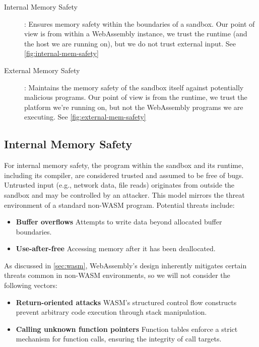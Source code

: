 \begin{description}
    \item[Internal Memory Safety]: Ensures memory safety within the boundaries of a sandbox.
    Our point of view is from within a WebAssembly instance, we trust the runtime (and the host we are running on), but we do not trust external input.
    See \cref{fig:internal-mem-safety}
    \item[External Memory Safety]: Maintains the memory safety of the sandbox itself against potentially malicious programs.
    Our point of view is from the runtime, we trust the platform we're running on, but not the WebAssembly programs we are executing.
    See \cref{fig:external-mem-safety}
\end{description}

\subsection{Internal Memory Safety}
\label{subsec:internal-memory-safety}
For internal memory safety, the program within the sandbox and its runtime, including its compiler, are considered trusted and assumed to be free of bugs.
Untrusted input (e.g., network data, file reads) originates from outside the sandbox and may be controlled by an attacker.
This model mirrors the threat environment of a standard non-\ac{WASM} program.
Potential threats include:

\begin{itemize}
    \item \textbf{Buffer overflows} Attempts to write data beyond allocated buffer boundaries.
    \item \textbf{Use-after-free} Accessing memory after it has been deallocated.
\end{itemize}

As discussed in \cref{sec:wasm}, WebAssembly's design inherently mitigates certain threats common in non-\ac{WASM} environments, so we will not consider the following vectors:

\begin{itemize}
    \item \textbf{Return-oriented attacks} {\ac{WASM}'s} structured control flow constructs prevent arbitrary code execution through stack manipulation.
    \item \textbf{Calling unknown function pointers} Function tables enforce a strict mechanism for function calls, ensuring the integrity of call targets.
\end{itemize}

